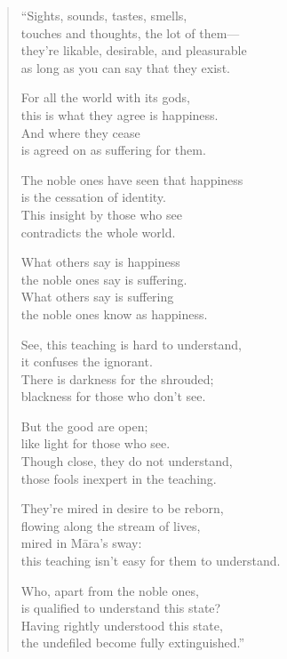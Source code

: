 \documentclass[12pt,openany]{book}%
\begin{document}
\begin{verse}%
“Sights, sounds, tastes, smells, \\
touches and thoughts, the lot of them—\\
they’re likable, desirable, and pleasurable \\
as long as you can say that they exist. 

For all the world with its gods, \\
this is what they agree is happiness. \\
And where they cease \\
is agreed on as suffering for them. 

The noble ones have seen that happiness \\
is the cessation of identity. \\
This insight by those who see \\
contradicts the whole world. 

What others say is happiness \\
the noble ones say is suffering. \\
What others say is suffering \\
the noble ones know as happiness. 

See, this teaching is hard to understand, \\
it confuses the ignorant. \\
There is darkness for the shrouded; \\
blackness for those who don’t see. 

But the good are open; \\
like light for those who see. \\
Though close, they do not understand, \\
those fools inexpert in the teaching. 

They’re mired in desire to be reborn, \\
flowing along the stream of lives, \\
mired in \textsanskrit{Māra}’s sway: \\
this teaching isn’t easy for them to understand. 

Who, apart from the noble ones, \\
is qualified to understand this state? \\
Having rightly understood this state, \\
the undefiled become fully extinguished.” 

%
\end{verse}
\end{document}
